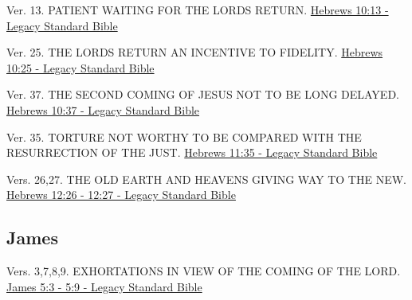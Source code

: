 \documentclass[
  ignorenonframetext,
]{beamer}
\begin{document}
\begin{frame}{10}
\label{section-239}
\begin{block}{Ver. 13. PATIENT WAITING FOR THE LORD\textquotesingle S
RETURN.}
\label{ver.-13.-patient-waiting-for-the-lords-return.}
\href{https://read.lsbible.org/?q=heb10\%3A13}{Hebrews 10:13 - Legacy
Standard Bible}
\end{block}

\begin{block}{Ver. 25. THE LORD\textquotesingle S RETURN AN INCENTIVE TO
FIDELITY.}
\label{ver.-25.-the-lords-return-an-incentive-to-fidelity.}
\href{https://read.lsbible.org/?q=heb10\%3A25}{Hebrews 10:25 - Legacy
Standard Bible}
\end{block}

\begin{block}{Ver. 37. THE SECOND COMING OF JESUS NOT TO BE LONG
DELAYED.}
\label{ver.-37.-the-second-coming-of-jesus-not-to-be-long-delayed.}
\href{https://read.lsbible.org/?q=heb10\%3A37}{Hebrews 10:37 - Legacy
Standard Bible}
\end{block}
\end{frame}

\begin{frame}{11}
\label{section-240}
\begin{block}{Ver. 35. TORTURE NOT WORTHY TO BE COMPARED WITH THE
RESURRECTION OF THE JUST.}
\label{ver.-35.-torture-not-worthy-to-be-compared-with-the-resurrection-of-the-just.}
\href{https://read.lsbible.org/?q=heb11\%3A35}{Hebrews 11:35 - Legacy
Standard Bible}
\end{block}
\end{frame}

\begin{frame}{12}
\label{section-241}
\begin{block}{Vers. 26,27. THE OLD EARTH AND HEAVENS GIVING WAY TO THE
NEW.}
\label{vers.-2627.-the-old-earth-and-heavens-giving-way-to-the-new.}
\href{https://read.lsbible.org/?q=heb12\%3A26-27}{Hebrews 12:26 - 12:27
- Legacy Standard Bible}
\end{block}
\end{frame}

\subsection{James}\label{james}

\begin{frame}{5}
\label{section-242}
\begin{block}{Vers. 3,7,8,9. EXHORTATIONS IN VIEW OF THE COMING OF THE
LORD.}
\label{vers.-3789.-exhortations-in-view-of-the-coming-of-the-lord.}
\href{https://read.lsbible.org/?q=james5\%3A3-9}{James 5:3 - 5:9 -
Legacy Standard Bible}
\end{block}
\end{frame}
\end{document}
